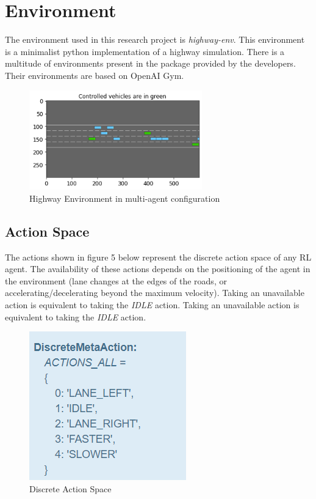 \documentclass[conference]{IEEEtran}
\begin{document}
\section{Environment}
The environment used in this research project is \textit{highway-env}\cite{highway-env}. This environment is a minimalist python implementation of a highway simulation. There is a multitude of environments present in the package provided by the developers.
Their environments are based on OpenAI Gym\cite{brockman2016openai}.

\begin{figure}[hbt!]
\vspace*{0.1cm}
\centerline{\includegraphics[width=75mm]{images/highway-env.png}}
\caption{Highway Environment in multi-agent configuration}\label{fig1}
\end{figure}

\subsection{Action Space}
The actions shown in figure 5 below represent the discrete action space of any RL agent. The availability of these actions depends on the positioning of the agent in the environment
(lane changes at the edges of the roads, or accelerating/decelerating beyond the maximum velocity). Taking an unavailable action is equivalent to taking the \textit{IDLE} action.
Taking an unavailable action is equivalent to taking the \textit{IDLE} action.
\begin{figure}[hbt!]
\centerline{\includegraphics[width=0.3\linewidth]{images/action_space.png}}
\caption{Discrete Action Space}
\label{fig2}
\end{figure}
\end{document}
